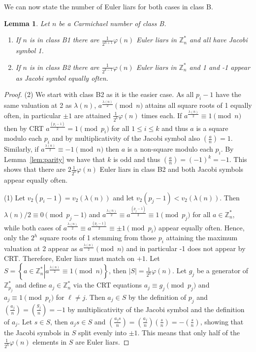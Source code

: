 \documentclass[runningheads]{amsart}
\newtheorem{lemma}[theorem]{Lemma}
\newcommand{\Z}{\mathbb{Z}}
\begin{document}
We can now state the number of Euler liars for both cases in class B.

\begin{lemma}\label{lem:classB}
Let $n$ be a Carmichael number of class B.
\begin{enumerate}
\item If $n$ is in class B1 there are $\frac{1}{2^{h+1}}\varphi(n)$ Euler liars in $\mathbb{Z}_n^*$ and all
have Jacobi symbol 1.
\item If $n$ is in class B2 there are $\frac{1}{2^{k-1}}\varphi(n)$ Euler liars in $\mathbb{Z}_n^*$ and 1 and
-1 appear as Jacobi symbol equally often.
\end{enumerate}
\end{lemma}
\begin{proof}
(2) We start with class B2 as it is the easier case.
As all
$p_i-1$
have the same valuation at 2 as
$\lambda(n)$,
$a^{\frac{\lambda(n)}{2}}\pmod
n$ attains all square roots of 1 equally often,
in particular
$\pm
1$ are attained
$\frac{1}{2^k}\varphi(n)$
times each.
If
$a^{\frac{\lambda(n)}{2}}\equiv
1\pmod
n$ then by CRT
$a^{\frac{(p_i-1)}{2}}=1
\pmod
p_i$
for all
$1\le
i
\le
k$ and thus $a$ is a square modulo each
$p_i$
and by multiplicativity of the Jacobi symbol also
$\left(\frac{a}{n}\right)=1$.
Similarly,
if
$a^{\frac{\lambda(n)}{2}}\equiv
-1\pmod
n$ then $a$ is a non-square modulo each
$p_i$.
By
Lemma~\ref{lem:parity}
we have that $k$ is odd and thus
$\left(\frac{a}{n}\right)=(-1)^k=-1$.
This shows that there are
$2\frac{1}{2^k}\varphi(n)$
Euler liars in class B2 and both Jacobi symbols appear equally often.

(1) Let
$v_2(p_i-1)=v_2(\lambda(n))$
and let
$v_2(p_j-1)<v_2(\lambda(n))$.
Then
$\lambda(n)/2\equiv
0
\pmod{p_j-1}$
and
$a^{\frac{\lambda(n)}{2}}
\equiv
a^{\frac{(p_j-1)}{2}}\equiv
1\pmod{p_j}$
for all
$a\in
\Z_n^*$,
while both cases of
$a^{\frac{\lambda(n)}{2}}
\equiv
a^{\frac{(p_i-1)}{2}}\equiv
\pm
1\pmod{p_i}$
appear equally often.
Hence,
only the
$2^h$
square roots of 1 stemming from those
$p_i$
attaining the maximum valuation at 2 appear as
$a^{\frac{\lambda(n)}{2}}\pmod
n$ and in particular -1 does not appear by CRT.
Therefore,
Euler liars must match on $+1$.
Let
$S=\left\{a
\in
\Z_n^*\left|
a^{\frac{\lambda(n)}{2}}\equiv
1\pmod
n\right\}\right.$,
then
$|S|=\frac{1}{2^h}\varphi(n)$.
Let
$g_j$
be a generator of
$\Z_{p_j}^*$
and define
$a_j
\in
\Z_n^*$
via the CRT equations
$a_j\equiv
g_j\pmod{p_j}$
and
$a_j\equiv
1\pmod{p_\ell}$
for
$\ell
\ne
j$.
Then
$a_j\in
S$ by the definition of
$p_j$
and
$\left(\frac{a_j}{n}\right)=\left(\frac{g_j}{n}\right)=-1$
by multiplicativity of the Jacobi symbol and the definition of
$a_j$.
Let
$s\in
S$,
then
$a_js
\in
S$ and
$\left(\frac{a_js}{n}\right)=\left(\frac{a_j}{n}\right)\left(\frac{s}{n}\right)
=-\left(\frac{s}{n}\right)$,
showing that the Jacobi symbols in $S$ split evenly into
$\pm
1$.
This means that only half of the
$\frac{1}{2^h}\varphi(n)$
elements in $S$ are Euler liars.
\end{proof}
\end{document}
